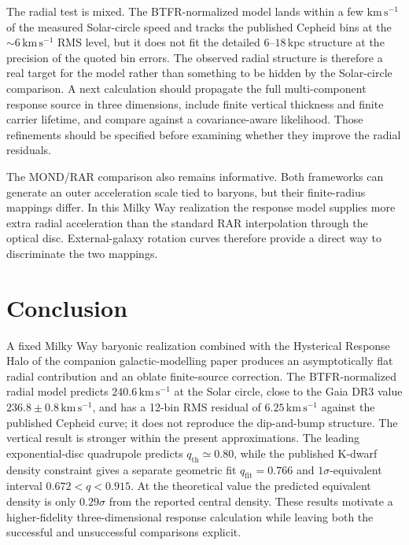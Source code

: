 \documentclass[11pt]{article}
\theoremstyle{definition}
\theoremstyle{remark}
\newcommand{\kms}{\mathrm{km\,s^{-1}}}
\newcommand{\qth}{q_{\mathrm{th}}}
\newcommand{\qfit}{q_{\mathrm{fit}}}
\begin{document}
The radial test is mixed.
The BTFR-normalized model lands within a few $\kms$ of the measured Solar-circle speed and tracks the published Cepheid bins at the $\sim6\,\kms$ RMS level, but it does not fit the detailed $6$--$18\,$kpc structure at the precision of the quoted bin errors.
The observed radial structure is therefore a real target for the model rather than something to be hidden by the Solar-circle comparison.
A next calculation should propagate the full multi-component response source in three dimensions, include finite vertical thickness and finite carrier lifetime, and compare against a covariance-aware likelihood.
Those refinements should be specified before examining whether they improve the radial residuals.

The MOND/RAR comparison also remains informative.
Both frameworks can generate an outer acceleration scale tied to baryons, but their finite-radius mappings differ.
In this Milky Way realization the response model supplies more extra radial acceleration than the standard RAR interpolation through the optical disc.
External-galaxy rotation curves therefore provide a direct way to discriminate the two mappings.

\section{Conclusion}
\label{sec:conclusion}
A fixed Milky Way baryonic realization combined with the Hysterical Response Halo of the companion galactic-modelling paper produces an asymptotically flat radial contribution and an oblate finite-source correction.
The BTFR-normalized radial model predicts $240.6\,\kms$ at the Solar circle, close to the Gaia DR3 value $236.8\pm0.8\,\kms$, and has a 12-bin RMS residual of $6.25\,\kms$ against the published Cepheid curve; it does not reproduce the dip-and-bump structure.
The vertical result is stronger within the present approximations.
The leading exponential-disc quadrupole predicts $\qth\simeq0.80$, while the published K-dwarf density constraint gives a separate geometric fit $\qfit=0.766$ and $1\sigma$-equivalent interval $0.672<q<0.915$.
At the theoretical value the predicted equivalent density is only $0.29\sigma$ from the reported central density.
These results motivate a higher-fidelity three-dimensional response calculation while leaving both the successful and unsuccessful comparisons explicit.



\end{document}
